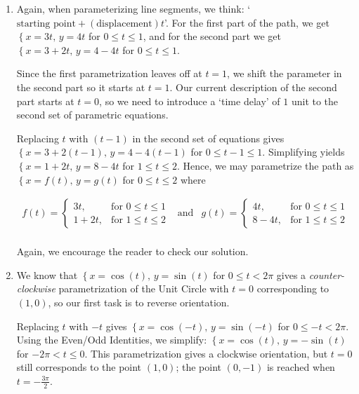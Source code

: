 \begin{ex}
\begin{enumerate}
\item  Again, when parameterizing line segments, we think: `$\text{starting point} + (\text{displacement})t$'.  For the first part of the path, we get $\left\{ x = 3t, \, y = 4t \right.$ for $0 \leq t \leq 1$, and for the second part we get $\left\{ x = 3 + 2t, \, y = 4 - 4t \right.$ for $0 \leq t \leq 1$. 

\smallskip

 Since the first parametrization leaves off at $t=1$, we shift the parameter in the second part so it starts at $t=1$.  Our current description of the second part starts at $t=0$, so we need to introduce a `time delay' of $1$ unit to the second set of parametric equations.  
 
 \smallskip
 
 Replacing $t$ with $(t-1)$ in the second set of  equations gives $\left\{ x = 3 + 2(t-1), \, y = 4 - 4(t-1) \right.$ for $0 \leq t-1 \leq 1$.   Simplifying yields $\left\{ x = 1+2t, \, y = 8  -4t \right.$ for $1 \leq t \leq 2$. Hence, we may parametrize the path as $\left\{ x = f(t), \, y = g(t) \right.$ for $0 \leq t \leq 2$ where

\[ \begin{array}{ccc}

f(t) = \left\{ \begin{array}{rl} 3t, & \text{for $0 \leq t \leq 1$} \\ 1+2t, & \text{for $1 \leq t \leq 2$} \end{array} \right. & \text{and} &  g(t) = \left\{ \begin{array}{rl} 4t, & \text{for $0 \leq t \leq 1$} \\ 8-4t, & \text{for $1 \leq t \leq 2$} \end{array} \right. \\

\end{array}\]

Again, we encourage the reader to check our solution.

\item  We know that $\left\{ x = \cos(t), \, y = \sin(t) \right.$ for $0 \leq t < 2\pi$ gives a \textit{counter-clockwise} parametrization of the Unit Circle with $t = 0$ corresponding to $(1,0)$, so our first task is to reverse  orientation.  

\smallskip

Replacing $t$ with $-t$ gives $\left\{ x = \cos(-t), \, y = \sin(-t) \right.$ for $0 \leq -t < 2\pi$.  Using the Even/Odd Identities, we simplify: $\left\{ x = \cos(t), \, y = -\sin(t) \right.$ for  $-2\pi <  t \leq  0$.  This parametrization gives a clockwise orientation, but $t=0$ still corresponds to the point $(1,0)$; the point $(0, -1)$ is reached when $t = -\frac{3\pi}{2}$.  


\end{enumerate}
\end{ex}
